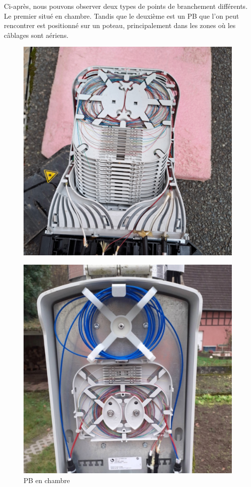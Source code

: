 \documentclass[12pt, a4paper]{article}
\begin{document}
\newpage
Ci-après, nous pouvons observer deux types de points de branchement
différents. Le premier situé en chambre. Tandis que le deuxième est un PB que l'on peut
rencontrer est positionné sur un poteau, principalement dans les zones où
les câblages sont aériens.
\begin{figure}[htbp]
    \centering
    \begin{minipage}[b]{0.4\textwidth}
		{\includegraphics[width=\textwidth]{img/pbc.jpg}}
      \caption{PB en chambre}
    \end{minipage}
    \hspace{0.5cm} %
    \begin{minipage}[b]{0.4\textwidth}
      \includegraphics[width=\textwidth]{img/pbp.jpg}

\end{minipage}
\end{figure}
\end{document}
